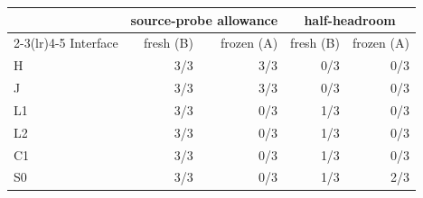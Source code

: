 \begin{tabular}{lrrrr}
\toprule
& \multicolumn{2}{c}{source-probe allowance} & \multicolumn{2}{c}{half-headroom} \\
\cmidrule(lr){2-3}\cmidrule(lr){4-5}
Interface & fresh (B) & frozen (A) & fresh (B) & frozen (A) \\
\midrule
H & 3/3 & 3/3 & 0/3 & 0/3 \\
J & 3/3 & 3/3 & 0/3 & 0/3 \\
L1 & 3/3 & 0/3 & 1/3 & 0/3 \\
L2 & 3/3 & 0/3 & 1/3 & 0/3 \\
C1 & 3/3 & 0/3 & 1/3 & 0/3 \\
S0 & 3/3 & 0/3 & 1/3 & 2/3 \\
\bottomrule
\end{tabular}

